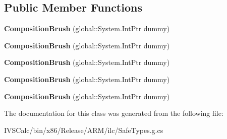 \subsection*{Public Member Functions}
\begin{DoxyCompactItemize}
\item 
\mbox{\label{class_windows_1_1_u_i_1_1_composition_1_1_composition_brush_a409b2cbcfba0b873b22cd301e40d4226}} 
{\bfseries Composition\+Brush} (global\+::\+System.\+Int\+Ptr dummy)
\item 
\mbox{\label{class_windows_1_1_u_i_1_1_composition_1_1_composition_brush_a409b2cbcfba0b873b22cd301e40d4226}} 
{\bfseries Composition\+Brush} (global\+::\+System.\+Int\+Ptr dummy)
\item 
\mbox{\label{class_windows_1_1_u_i_1_1_composition_1_1_composition_brush_a409b2cbcfba0b873b22cd301e40d4226}} 
{\bfseries Composition\+Brush} (global\+::\+System.\+Int\+Ptr dummy)
\item 
\mbox{\label{class_windows_1_1_u_i_1_1_composition_1_1_composition_brush_a409b2cbcfba0b873b22cd301e40d4226}} 
{\bfseries Composition\+Brush} (global\+::\+System.\+Int\+Ptr dummy)
\item 
\mbox{\label{class_windows_1_1_u_i_1_1_composition_1_1_composition_brush_a409b2cbcfba0b873b22cd301e40d4226}} 
{\bfseries Composition\+Brush} (global\+::\+System.\+Int\+Ptr dummy)
\end{DoxyCompactItemize}


The documentation for this class was generated from the following file\+:\begin{DoxyCompactItemize}
\item 
I\+V\+S\+Calc/bin/x86/\+Release/\+A\+R\+M/ilc/Safe\+Types.\+g.\+cs\end{DoxyCompactItemize}
